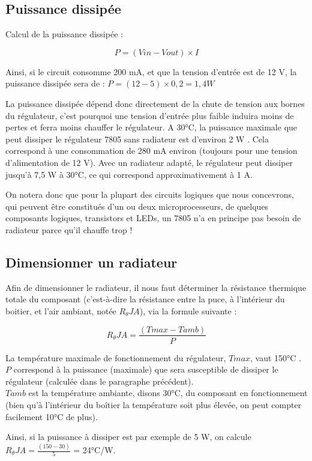 \documentclass[a4paper]{article}
\begin{document}
\subsection{Puissance dissipée}

Calcul de la puissance dissipée :

\[P = (Vin - Vout)\times{}I\]

Ainsi, si le circuit consomme 200 mA, et que la tension d'entrée est de 12 V, la puissance dissipée sera de : $P = (12 - 5)\times{}0,2 = 1,4 W$

La puissance dissipée dépend donc directement de la chute de tension aux bornes du régulateur, c'est pourquoi une tension d'entrée plus faible induira moins de pertes et ferra moins chauffer le régulateur. A 30°C, la puissance maximale que peut dissiper le régulateur 7805 sans radiateur est d'environ 2 W \cite{7805}. Cela correspond à une consommation de 280 mA environ (toujours pour une tension d'alimentation de 12 V). Avec un radiateur adapté, le régulateur peut dissiper jusqu'à 7,5 W à 30°C, ce qui correspond approximativement à 1 A.

On notera donc que pour la plupart des circuits logiques que nous concevrons, qui peuvent être constitués d'un ou deux microprocesseurs, de quelques composants logiques, transistors et \acp{LED}, un 7805 n'a en principe pas besoin de radiateur parce qu'il chauffe trop !

\subsection{Dimensionner un radiateur}

Afin de dimensionner le radiateur, il nous faut déterminer la résistance thermique totale du composant (c'est-à-dire la résistance entre la puce, à l'intérieur du boitier, et l'air ambiant, notée $R_{\theta}JA$), via la formule suivante :

\[R_{\theta}JA = \frac{(Tmax - Tamb)}{P}\]

La température maximale de fonctionnement du régulateur, $Tmax$, vaut 150°C \cite{7805}.\\
$P$ correspond à la puissance (maximale) que sera susceptible de dissiper le régulateur (calculée dans le paragraphe précédent).\\
$Tamb$ est la température ambiante, disons 30°C, du composant en fonctionnement (bien qu'à l'intérieur du boîtier la température soit plus élevée, on peut compter facilement 10°C de plus).

Ainsi, si la puissance à dissiper est par exemple de 5 W, on calcule $R_{\theta}JA = \frac{(150 - 30)}{5}$ = 24°C/W.
\end{document}
